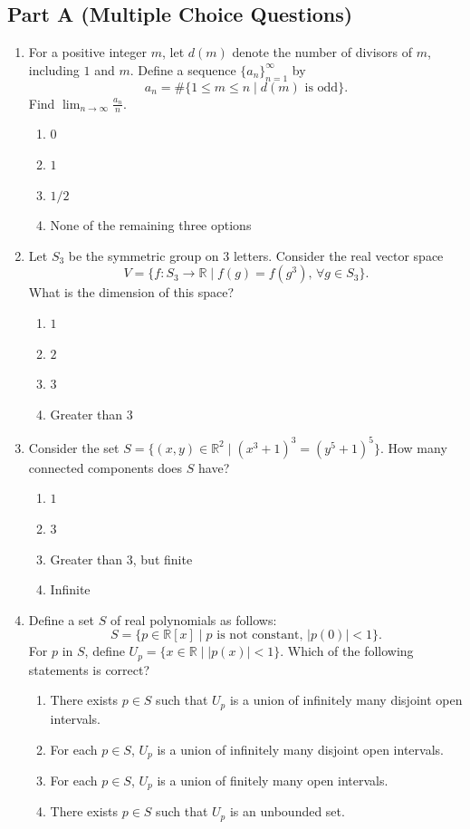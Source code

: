 \documentclass[11pt, a4paper]{article}
\begin{document}
\subsection*{Part A (Multiple Choice Questions)}
\begin{enumerate}
  \item For a positive integer $m$, let $d(m)$ denote the number of divisors of $m$, including $1$ and $m$. Define a sequence $\{a_n\}_{n=1}^\infty$ by
  \[
    a_n = \#\{1 \le m \le n \mid d(m) \text{ is odd}\}.
  \]
  Find $\lim_{n \to \infty} \frac{a_n}{n}$.
  \begin{enumerate}[label=(\alph*)]
    \item $0$
    \item $1$
    \item $1/2$
    \item None of the remaining three options
  \end{enumerate}

  \item Let $S_3$ be the symmetric group on $3$ letters. Consider the real vector space
  \[
    V = \{f: S_3 \to \mathbb{R} \mid f(g) = f(g^3), \, \forall g \in S_3\}.
  \]
  What is the dimension of this space?
  \begin{enumerate}[label=(\alph*)]
    \item $1$
    \item $2$
    \item $3$
    \item Greater than $3$
  \end{enumerate}

  \item Consider the set $S = \{(x, y) \in \mathbb{R}^2 \mid (x^3 + 1)^3 = (y^5 + 1)^5\}$. How many connected components does $S$ have?
  \begin{enumerate}[label=(\alph*)]
    \item $1$
    \item $3$
    \item Greater than $3$, but finite
    \item Infinite
  \end{enumerate}

  \item Define a set $S$ of real polynomials as follows:
  \[
    S = \{p \in \mathbb{R}[x] \mid p \text{ is not constant, } |p(0)| < 1\}.
  \]
  For $p$ in $S$, define $U_p = \{x \in \mathbb{R} \mid |p(x)| < 1\}$. Which of the following statements is correct?
  \begin{enumerate}[label=(\alph*)]
    \item There exists $p \in S$ such that $U_p$ is a union of infinitely many disjoint open intervals.
    \item For each $p \in S$, $U_p$ is a union of infinitely many disjoint open intervals.
    \item For each $p \in S$, $U_p$ is a union of finitely many open intervals.
    \item There exists $p \in S$ such that $U_p$ is an unbounded set.
  \end{enumerate}


\end{enumerate}
\end{document}

